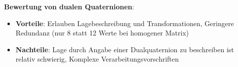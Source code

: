 \textbf{Bewertung von dualen Quaternionen}:
\begin{itemize}
	\item \textbf{Vorteile}: Erlauben Lagebeschreibung und Transformationen, Geringere Redundanz (nur 8 statt 12 Werte bei homogener Matrix)
	\item \textbf{Nachteile}: Lage durch Angabe einer Dualquaternion zu beschreiben ist relativ schwierig, Komplexe Verarbeitungsvorschriften 
\end{itemize}